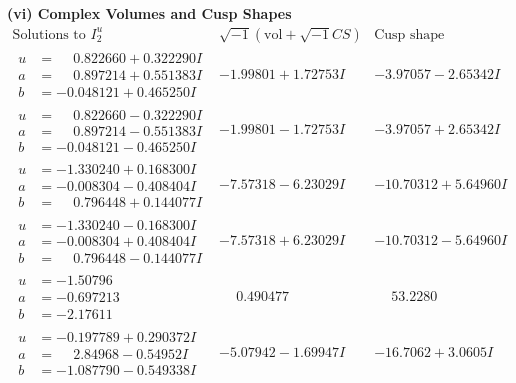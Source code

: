 \documentclass[1p]{elsarticle_modified}
\theoremstyle{definition}
\newcommand{\I}{\sqrt{-1}}
\begin{document}
\newpage\flushleft \textbf{(vi) Complex Volumes and Cusp Shapes}
$$\begin{array}{c|c|c}  
\text{Solutions to }I^u_{2}& \I (\text{vol} + \sqrt{-1}CS) & \text{Cusp shape}\\
 \hline 
\begin{aligned}
u &= \phantom{-}0.822660 + 0.322290 I \\
a &= \phantom{-}0.897214 + 0.551383 I \\
b &= -0.048121 + 0.465250 I\end{aligned}
 & -1.99801 + 1.72753 I & -3.97057 - 2.65342 I \\ \hline\begin{aligned}
u &= \phantom{-}0.822660 - 0.322290 I \\
a &= \phantom{-}0.897214 - 0.551383 I \\
b &= -0.048121 - 0.465250 I\end{aligned}
 & -1.99801 - 1.72753 I & -3.97057 + 2.65342 I \\ \hline\begin{aligned}
u &= -1.330240 + 0.168300 I \\
a &= -0.008304 - 0.408404 I \\
b &= \phantom{-}0.796448 + 0.144077 I\end{aligned}
 & -7.57318 - 6.23029 I & -10.70312 + 5.64960 I \\ \hline\begin{aligned}
u &= -1.330240 - 0.168300 I \\
a &= -0.008304 + 0.408404 I \\
b &= \phantom{-}0.796448 - 0.144077 I\end{aligned}
 & -7.57318 + 6.23029 I & -10.70312 - 5.64960 I \\ \hline\begin{aligned}
u &= -1.50796\phantom{ +0.000000I} \\
a &= -0.697213\phantom{ +0.000000I} \\
b &= -2.17611\phantom{ +0.000000I}\end{aligned}
 & \phantom{-}0.490477\phantom{ +0.000000I} & \phantom{-}53.2280\phantom{ +0.000000I} \\ \hline\begin{aligned}
u &= -0.197789 + 0.290372 I \\
a &= \phantom{-}2.84968 - 0.54952 I \\
b &= -1.087790 - 0.549338 I\end{aligned}
 & -5.07942 - 1.69947 I & -16.7062 + 3.0605 I \\ \hline\begin{aligned}

\end{aligned}
\end{array}$$
\end{document}
